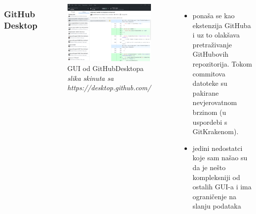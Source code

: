 \documentclass[hyperref={bookmarks=false},aspectratio=169]{beamer}
\begin{document}
\begin{frame}
\begin{columns}
\frametitle{GitHub Desktop}
\begin{figure}


\includegraphics[width=\columnwidth]{./figures/github-desktop-screenshot-windows.png}
    \centering
    \caption{GUI od GitHubDesktopa  \emph{\\slika skinuta sa https://desktop.github.com/}}
\end{figure}
\begin{itemize}
    \item ponaša se kao ekstenzija GitHuba i uz to olakšava pretraživanje GitHubovih repozitorija. Tokom commitova datoteke su pakirane nevjerovatnom brzinom (u uspordebi s GitKrakenom). 
    \item jedini nedostatci koje sam našao su da je nešto kompleksniji od ostalih GUI-a i ima ograničenje na slanju podataka
\end{itemize}
 
\end{columns}

\end{frame}
\end{document}

